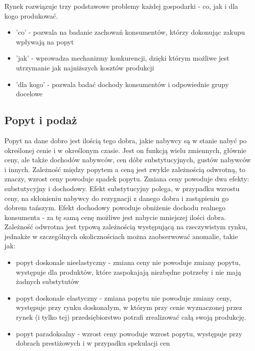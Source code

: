 \documentclass[12pt]{extarticle}
\begin{document}
Rynek rozwiązuje trzy podstawowe problemy każdej gospodarki - co, jak i dla kogo produkować.

\begin{itemize}
	\item  'co' - pozwala na badanie zachowań konsumentów, którzy dokonując zakupu wpływają na popyt
	\item 'jak' - wprowadza mechanizmy konkurencji, dzięki którym możliwe jest utrzymanie jak najniższych kosztów produkcji
    \item 'dla kogo' - pozwala badać dochody konsumentów i odpowiednie grupy docelowe
\end{itemize}

\subsection{Popyt i podaż}

Popyt na dane dobro jest ilością tego dobra, jakie nabywcy są w stanie nabyć po określonej cenie i w określonym czasie. Jest on funkcją wielu zmiennych, głównie ceny, ale także dochodów nabywców, cen dóbr substytucyjnych, gustów nabywców i innych. Zależność między popytem a ceną jest zwykle zależnością odwrotną, to znaczy, wzrost ceny powoduje spadek popytu. Zmiana ceny powoduje dwa efekty: substutycyjny i dochodowy. Efekt substytucyjny polega, w przypadku wzrostu ceny, na skłonieniu nabywcy do rezygnacji z danego dobra i zastąpieniu go dobrem tańszym. Efekt dochodowy powoduje obniżenie dochodu realnego konsumenta - za tę samą cenę możliwe jest nabycie mniejszej ilości dobra. Zależność odwrotna jest typową zależnością występującą na rzeczywistym rynku, jednakże w szczególnych okolicznościach można zaobserwować anomalie, takie jak:

\begin{itemize}
	\item popyt doskonale nieelastyczny - zmiana ceny nie powoduje zmiany popytu, występuje dla produktów, które zaspokajają niezbędne potrzeby i nie mają żadnych substytutów
    \item popyt doskonale elastyczny - zmiana popytu nie powoduje zmiany ceny, występuje przy rynku doskonałym, w którym przy cenie wyznaczonej przez rynek (i tylko tej) przedsiębiorstwo potrafi zrealizować całą swoją produkcję.
    \item popyt paradoksalny - wzrost ceny powoduje wzrost popytu, występuje przy dobrach prestiżowych i w przypadku spekulacji cen
\end{itemize}
\end{document}
